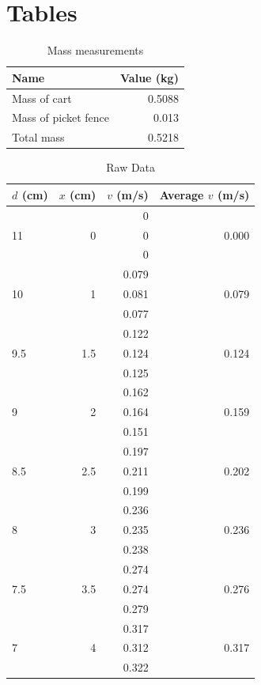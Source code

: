 \section{Tables}
\FloatBarrier
\begin{table}
    \centering
    \begin{tabular}{|l|r|}
        \hline
        Name & Value (kg) \\
        \hline
        Mass of cart & 0.5088 \\
        Mass of picket fence & 0.013 \\
        \hline
        Total mass & 0.5218 \\
        \hline
    \end{tabular}
    \caption{Mass measurements}
    \label{table:06.mass}
\end{table}
\begin{table}
    \centering
    \begin{tabular}{|l|r|r|r|}
        \hline
        $d$ (cm) & $x$ (cm) & $v$ (m/s) & Average $v$ (m/s) \\
        \hline
         & & 0 & \\
        11 & 0 & 0 & 0.000 \\
         & & 0 & \\
        \hline
         & & 0.079 & \\
        10 & 1 & 0.081 & 0.079 \\
         & & 0.077 & \\
        \hline
         & & 0.122 & \\
        9.5 & 1.5 & 0.124 & 0.124 \\
         & & 0.125 & \\
        \hline
         & & 0.162 & \\
        9 & 2 & 0.164 & 0.159 \\
         & & 0.151 & \\
        \hline
         & & 0.197 & \\
        8.5 & 2.5 & 0.211 & 0.202 \\
         & & 0.199 & \\
        \hline
         & & 0.236 & \\
        8 & 3 & 0.235 & 0.236 \\
         & & 0.238 & \\
        \hline
         & & 0.274 & \\
        7.5 & 3.5 & 0.274 & 0.276 \\
         & & 0.279 & \\
        \hline
         & & 0.317 & \\
        7 & 4 & 0.312 & 0.317 \\
         & & 0.322 & \\
        \hline
    \end{tabular}
    \caption{Raw Data}
    \label{table:06.data}
\end{table}
\newpage
